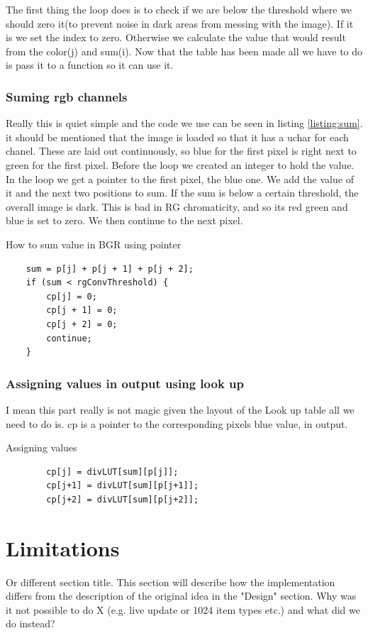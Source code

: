 The first thing the loop does is to check if we are below the threshold where we should zero it(to prevent noise in dark areas from messing with the image). If it is we set the index to zero. Otherwise we calculate the value that would result from the color(j) and sum(i).
Now that the table has been made all we have to do is pass it to a function so it can use it.

\subsubsection{Suming rgb channels}

Really this is quiet simple and the code we use can be seen in listing \ref{listing:sum}. it should be mentioned that the image is loaded so that it has a uchar for each chanel. These are laid out continuously, so blue for the first pixel is right next to green for the first pixel. Before the loop we created an integer to hold the value. In the loop we get a pointer to the first pixel, the blue one. We add the value of it and the next two positions to sum. If the sum is below a certain threshold, the overall image is dark. This is bad in RG chromaticity, and so its red green and blue is set to zero. We then continue to the next pixel.
\begin{listing}[H]
	\caption{How to sum value in BGR using pointer}
	\label{listing:sum}
	\begin{verbatim}
	sum = p[j] + p[j + 1] + p[j + 2];
	if (sum < rgConvThreshold) {
		cp[j] = 0;
		cp[j + 1] = 0;
		cp[j + 2] = 0;
		continue;
	}
	\end{verbatim}
\end{listing}
\subsubsection{Assigning values in output using look up}
I mean this part really is not  magic given the layout of the Look up table all we need to do is. cp is a pointer to the corresponding pixels blue value, in output.
\begin{listing}[H]
	\caption{Assigning values}
	\label{listing:sum}
	\begin{verbatim}
		cp[j] = divLUT[sum][p[j]];
		cp[j+1] = divLUT[sum][p[j+1]];
		cp[j+2] = divLUT[sum][p[j+2]];
	\end{verbatim}
\end{listing}


\section{Limitations}
Or different section title. This section will describe how the implementation differs from the description of the original idea in the "Design" section. Why was it not possible to do X (e.g. live update or 1024 item types etc.) and what did we do instead?